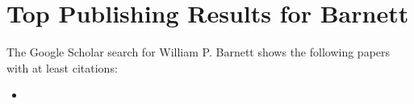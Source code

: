 \section{Top Publishing Results for Barnett}

The Google Scholar search for William P. Barnett shows the following papers with at least  citations:\\

\begin{itemize}
\item 
\end{itemize}

